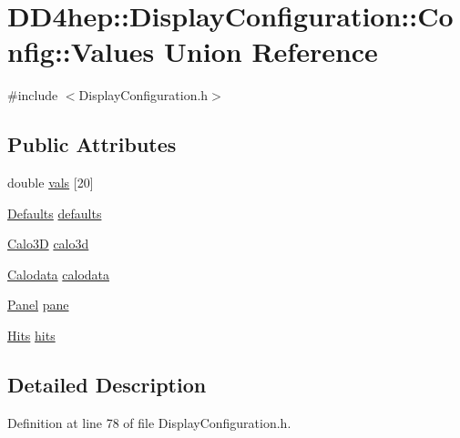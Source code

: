 \hypertarget{union_d_d4hep_1_1_display_configuration_1_1_config_1_1_values}{
\section{DD4hep::DisplayConfiguration::Config::Values Union Reference}
\label{union_d_d4hep_1_1_display_configuration_1_1_config_1_1_values}
}


{\ttfamily \#include $<$DisplayConfiguration.h$>$}\subsection*{Public Attributes}
\begin{DoxyCompactItemize}
\item 
double \hyperlink{union_d_d4hep_1_1_display_configuration_1_1_config_1_1_values_aba0dbc907603e0decb003ec889e684b9}{vals} \mbox{[}20\mbox{]}
\item 
\hyperlink{struct_d_d4hep_1_1_display_configuration_1_1_defaults}{Defaults} \hyperlink{union_d_d4hep_1_1_display_configuration_1_1_config_1_1_values_af0a8cde0c8737c87ee05d38de1f93505}{defaults}
\item 
\hyperlink{struct_d_d4hep_1_1_display_configuration_1_1_calo3_d}{Calo3D} \hyperlink{union_d_d4hep_1_1_display_configuration_1_1_config_1_1_values_adbed006d75dc86cab0e4774c82e4be48}{calo3d}
\item 
\hyperlink{struct_d_d4hep_1_1_display_configuration_1_1_calodata}{Calodata} \hyperlink{union_d_d4hep_1_1_display_configuration_1_1_config_1_1_values_ad20f453699ee7904ed8b510fa714b184}{calodata}
\item 
\hyperlink{struct_d_d4hep_1_1_display_configuration_1_1_panel}{Panel} \hyperlink{union_d_d4hep_1_1_display_configuration_1_1_config_1_1_values_af61c2a6b0a332acd9edf8e8387e8fd0c}{pane}
\item 
\hyperlink{struct_d_d4hep_1_1_display_configuration_1_1_hits}{Hits} \hyperlink{union_d_d4hep_1_1_display_configuration_1_1_config_1_1_values_ab649c49cff98283b0349025bb35e329a}{hits}
\end{DoxyCompactItemize}


\subsection{Detailed Description}


Definition at line 78 of file DisplayConfiguration.h.

